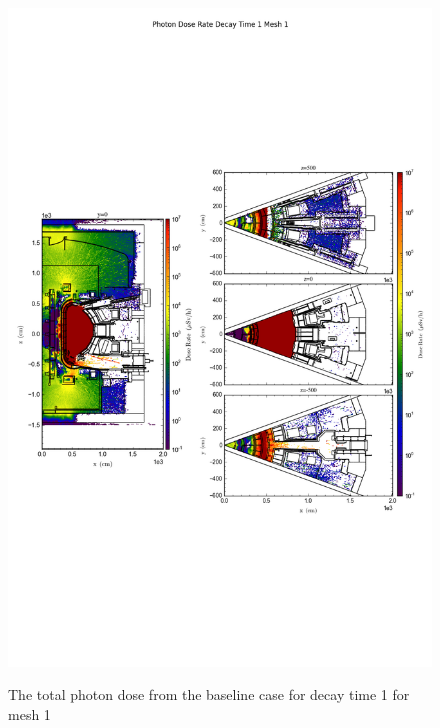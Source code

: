 \begin{figure}[ht!]
\centering
\includegraphics[trim={0cm 9cm 0cm 10cm},clip,scale=0.75]{../plots/final_model/Photon_Dose_Rate_Decay_Time_1_Mesh_1.png}
\label{fig:photons_dc1_no4bc_m1_flux}
\caption{The total photon dose from the baseline case for decay time 1 for mesh 1}
\end{figure}
